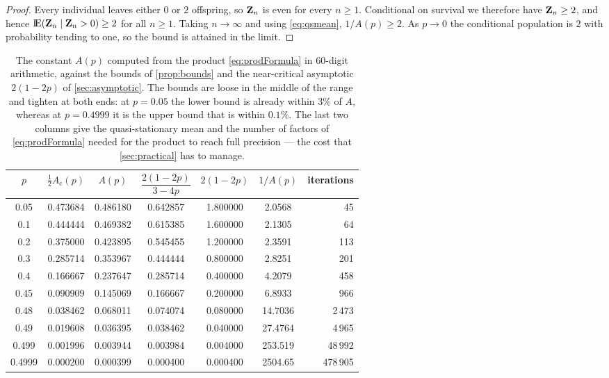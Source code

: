 \begin{proof}
Every individual leaves either $0$ or $2$ offspring, so ${\bf Z}_n$ is even for every
$n\ge1$. Conditional on survival we therefore have ${\bf Z}_n\ge2$, and hence
${\rm I}\!{\rm E}({\bf Z}_n\mid {\bf Z}_n>0)\ge2$ for all $n\ge1$. Taking $n\to\infty$ and using
\cref{eq:qsmean}, $1/A(p)\ge2$. As $p\to0$ the conditional population is $2$ with
probability tending to one, so the bound is attained in the limit.
\end{proof}

\begin{table}[ht]
\centering
\caption{The constant $A(p)$ computed from the product \cref{eq:prodFormula} in
$60$-digit arithmetic, against the bounds of \cref{prop:bounds} and the near-critical
asymptotic $2(1-2p)$ of \cref{sec:asymptotic}. The bounds are loose in the middle of
the range and tighten at both ends: at $p=0.05$ the lower bound is already within
$3\%$ of $A$, whereas at $p=0.4999$ it is the upper bound that is within $0.1\%$.
The last two columns give the quasi-stationary mean and the number of factors of
\cref{eq:prodFormula} needed for the product to reach full precision --- the cost
that \cref{sec:practical} has to manage.}
\label{tab:Avals}
\begin{tabular}{ccccccr}
\toprule
$p$ & $\tfrac12 A_{\text{c}}(p)$ & $A(p)$ & $\dfrac{2(1-2p)}{3-4p}$ & $2(1-2p)$ & $1/A(p)$ & iterations\\
\midrule
0.05   & 0.473684 & 0.486180 & 0.642857 & 1.800000 & 2.0568 & 45 \\
0.1    & 0.444444 & 0.469382 & 0.615385 & 1.600000 & 2.1305 & 64 \\
0.2    & 0.375000 & 0.423895 & 0.545455 & 1.200000 & 2.3591 & 113 \\
0.3    & 0.285714 & 0.353967 & 0.444444 & 0.800000 & 2.8251 & 201 \\
0.4    & 0.166667 & 0.237647 & 0.285714 & 0.400000 & 4.2079 & 458 \\
0.45   & 0.090909 & 0.145069 & 0.166667 & 0.200000 & 6.8933 & 966 \\
0.48   & 0.038462 & 0.068011 & 0.074074 & 0.080000 & 14.7036 & 2\,473 \\
0.49   & 0.019608 & 0.036395 & 0.038462 & 0.040000 & 27.4764 & 4\,965 \\
0.499  & 0.001996 & 0.003944 & 0.003984 & 0.004000 & 253.519 & 48\,992 \\
0.4999 & 0.000200 & 0.000399 & 0.000400 & 0.000400 & 2504.65 & 478\,905 \\
\bottomrule
\end{tabular}
\end{table}

